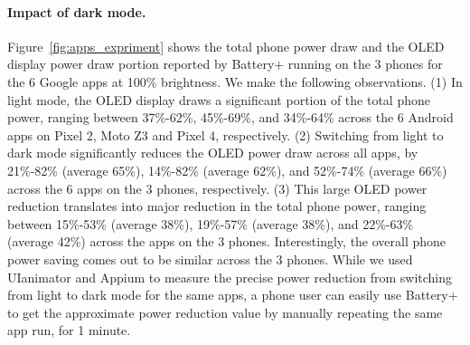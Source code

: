 \paragraph{Impact of dark mode.}
Figure~\ref{fig:apps_expriment} shows the total phone power draw and
the OLED display power draw portion reported by Battery+
running on the 3 phones for the 6 Google apps at 100\% brightness.
We make the following observations.
%
(1) In light mode,
the OLED display draws a significant portion of the total phone power,
ranging between 
37\%-62\%, 45\%-69\%, and 34\%-64\% 
across the 6 Android apps on Pixel 2, Moto Z3 and Pixel 4, respectively.
%
%
(2) Switching from light to dark mode significantly
reduces the OLED power draw across all apps, by
21\%-82\% (average 65\%), 14\%-82\% (average 62\%), and 52\%-74\%  (average 66\%)
across the 6 apps on the 3 phones, respectively. 
(3) This large OLED power reduction translates into
major reduction in the total phone power,
ranging between 15\%-53\% (average 38\%), 19\%-57\% (average 38\%), and 22\%-63\%  (average 42\%)
across the apps on the 3 phones.
Interestingly,
the overall phone power saving comes out to
be similar across the 3 phones.
%
While we used UIanimator and Appium to measure the precise
power reduction from switching from light to dark mode for the same apps,
a phone user can easily use Battery+ to get the approximate power reduction value
by manually repeating the same app run, \eg for 1 minute.


